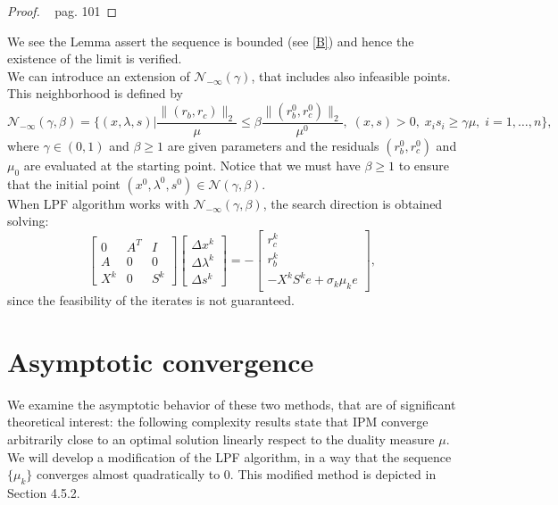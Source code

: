\documentclass[a4paper,10 pt,titlepage,twoside]{book}
\theoremstyle{plain}
\theoremstyle{definition}
\theoremstyle{remark}
\begin{document}
\begin{proof}
	~\cite{Wright} pag. 101
\end{proof}
We see the Lemma assert the sequence is bounded (see \ref{B}) and hence the existence of the limit is verified.\\
We can introduce an extension of $\mathcal{N}_{-\infty}(\gamma)$, that includes also infeasible points. This neighborhood is defined by
\begin{equation}\label{neigh3}
\mathcal{N}_{-\infty}(\gamma,\beta) =\Bigg\{(x, \lambda, s) | \frac{\lVert(r_{b}, r_{c})\rVert_{2}}{\mu} \leq \beta\frac{\lVert(r_{b}^{0}, r_{c}^{0})\rVert_{2}}{\mu^{0}},\; (x, s)>0,\; x_{i}s_{i} \geq \gamma\mu,\;i = 1,\dots, n \Bigg\},
\end{equation}
where $\gamma\in(0,1)$ and $\beta \geq 1$ are given parameters and the residuals $(r_{b}^{0}, r_{c}^{0})$ and $\mu_{0}$ are evaluated at the starting point. Notice that we must have $\beta \geq 1$ to ensure that the initial point $(x^{0}, \lambda^{0}, s^{0})\in\mathcal{N}(\gamma,\beta)$.\\
When LPF algorithm works with $\mathcal{N}_{-\infty}(\gamma,\beta)$, the search direction is obtained solving:
	\begin{equation*}
\begin{bmatrix}
0&A^{T}&I \\A&0&0\\X^{k}&0&S^{k}
\end{bmatrix}\begin{bmatrix}
\Delta x^{k}\\\Delta\lambda^{k} \\\Delta s^{k}
\end{bmatrix}=-\begin{bmatrix}
r_{c}^{k}\\r_{b}^{k}\\-X^{k}S^{k}e + \sigma_{k}\mu_{k}e
\end{bmatrix},
\end{equation*}
since the feasibility of the iterates is not guaranteed.
\section{Asymptotic convergence}
We examine the asymptotic behavior of these two methods, that are of significant theoretical interest: the following complexity results state that IPM converge arbitrarily close to an optimal solution linearly respect to the duality measure $\mu$. We will develop a modification of the LPF algorithm, in a way that the sequence $\{\mu_{k}\}$ converges almost quadratically to 0. This modified method is depicted in Section 4.5.2.\\
\end{document}
